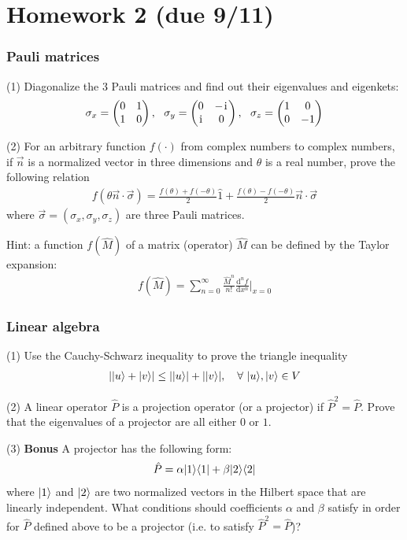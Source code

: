 \chapter{Homework 2 (due 9/11)}


\subsection{Pauli matrices}

(1) Diagonalize the 3 Pauli matrices and find out their eigenvalues and eigenkets:
\begin{align}
\sigma_x=\begin{pmatrix}0&1\\1&0\end{pmatrix},~~\sigma_y=\begin{pmatrix}0&-\hspace{1pt}\mathrm{i}\hspace{1pt}\\ \hspace{1pt}\mathrm{i}\hspace{1pt}&0\end{pmatrix},~~\sigma_z=\begin{pmatrix}1&0\\0&-1\end{pmatrix}
\end{align}

(2) For an arbitrary function $f(\cdot)$ from complex numbers to complex numbers, if $\vec n$ is a normalized vector in three dimensions and $\theta$ is a real number, prove the following relation
\begin{align}
f(\theta\vec n\cdot\vec\sigma)=\frac{f(\theta)+f(-\theta)}2\hat 1+\frac{f(\theta)-f(-\theta)}2\vec n\cdot\vec\sigma
\end{align}
where $\vec\sigma=(\sigma_x,\sigma_y,\sigma_z)$ are three Pauli matrices.

Hint: a function $f(\hat M)$ of a matrix (operator) $\hat M$ can be defined by the Taylor expansion:
\begin{align}
f(\hat M)=\sum_{n=0}^\infty\frac{\hat M^n}{n!}\frac{\text{d}^{n}f}{\text{d}x^n}|_{x=0}
\end{align}



\subsection{Linear algebra}

(1) Use the Cauchy-Schwarz inequality to prove the triangle inequality
\begin{align}
||{u}\rangle+|{v}\rangle|\leq||{u}\rangle|+||{v}\rangle|,~~~\forall~|{u}\rangle,|{v}\rangle\in V
\end{align}

(2) A linear operator $\hat P$ is a projection operator (or a projector) if $\hat P^2=\hat P$. Prove that the eigenvalues of a projector are all either $0$ or $1$. 

(3) \textbf{Bonus} A projector has the following form:
\begin{align}
\hat P=\alpha|{1}\rangle\langle{1}|+\beta|{2}\rangle\langle{2}|
\end{align}
where $|{1}\rangle$ and $|{2}\rangle$ are two normalized vectors in the Hilbert space that are linearly independent. What conditions should coefficients $\alpha$ and $\beta$ satisfy in order for $\hat P$ defined above to be a projector (i.e. to satisfy $\hat P^2=\hat P$)?

